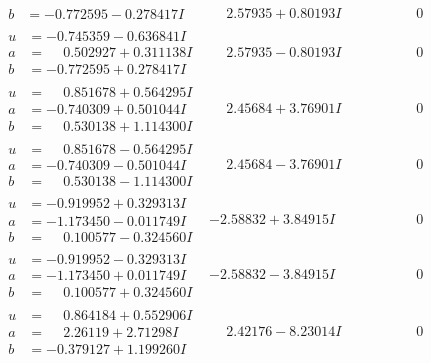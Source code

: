 \documentclass[1p]{elsarticle_modified}
\theoremstyle{definition}
\begin{document}
$$\begin{array}{c|c|c}
\begin{aligned}
b &= -0.772595 - 0.278417 I\end{aligned}
 & \phantom{-}2.57935 + 0.80193 I & \phantom{-0.000000 } 0 \\ \hline\begin{aligned}
u &= -0.745359 - 0.636841 I \\
a &= \phantom{-}0.502927 + 0.311138 I \\
b &= -0.772595 + 0.278417 I\end{aligned}
 & \phantom{-}2.57935 - 0.80193 I & \phantom{-0.000000 } 0 \\ \hline\begin{aligned}
u &= \phantom{-}0.851678 + 0.564295 I \\
a &= -0.740309 + 0.501044 I \\
b &= \phantom{-}0.530138 + 1.114300 I\end{aligned}
 & \phantom{-}2.45684 + 3.76901 I & \phantom{-0.000000 } 0 \\ \hline\begin{aligned}
u &= \phantom{-}0.851678 - 0.564295 I \\
a &= -0.740309 - 0.501044 I \\
b &= \phantom{-}0.530138 - 1.114300 I\end{aligned}
 & \phantom{-}2.45684 - 3.76901 I & \phantom{-0.000000 } 0 \\ \hline\begin{aligned}
u &= -0.919952 + 0.329313 I \\
a &= -1.173450 - 0.011749 I \\
b &= \phantom{-}0.100577 - 0.324560 I\end{aligned}
 & -2.58832 + 3.84915 I & \phantom{-0.000000 } 0 \\ \hline\begin{aligned}
u &= -0.919952 - 0.329313 I \\
a &= -1.173450 + 0.011749 I \\
b &= \phantom{-}0.100577 + 0.324560 I\end{aligned}
 & -2.58832 - 3.84915 I & \phantom{-0.000000 } 0 \\ \hline\begin{aligned}
u &= \phantom{-}0.864184 + 0.552906 I \\
a &= \phantom{-}2.26119 + 2.71298 I \\
b &= -0.379127 + 1.199260 I\end{aligned}
 & \phantom{-}2.42176 - 8.23014 I & \phantom{-0.000000 } 0 \\ \hline\begin{aligned}

\end{aligned}
\end{array}$$
\end{document}
